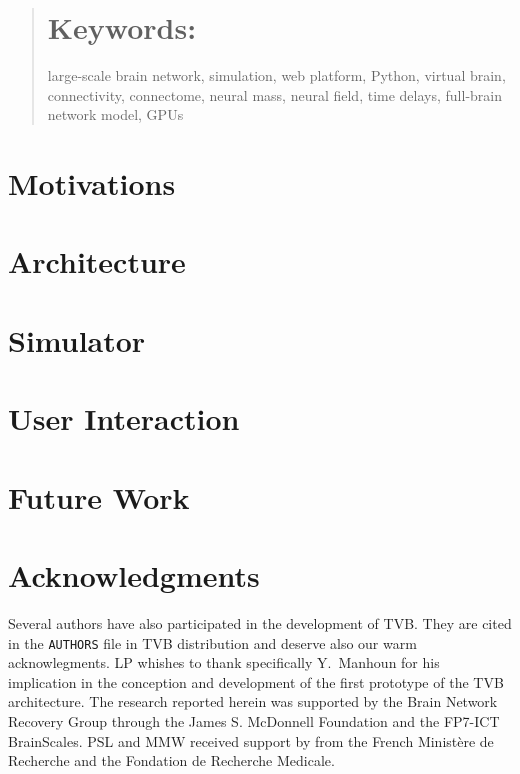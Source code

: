 \begin{abstract}
  
\section{Keywords:} large-scale brain network, simulation,  web platform, Python, virtual
brain, connectivity, connectome, neural mass, neural field, time delays,
full-brain network model, GPUs

\end{abstract}



\section{Motivations}


\section{Architecture}


\section{Simulator}


\section{User Interaction}


\section{Future Work}


\section*{Acknowledgments}
Several authors have also participated in the
development of TVB. They are cited in the \texttt{AUTHORS} file in TVB
distribution and deserve also our warm acknowlegments. LP whishes to thank
specifically Y.~Manhoun for his implication in the conception and development
of the first prototype of the TVB architecture. The research reported herein
was supported by the  Brain Network Recovery Group through the James S.
McDonnell Foundation and the FP7-ICT BrainScales. PSL and MMW received
support by from the French Minist\`{e}re de Recherche and the Fondation
de Recherche Medicale.






